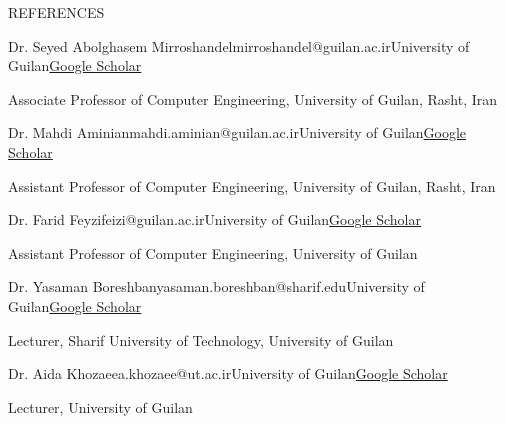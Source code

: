 \documentclass[]{CV}
\begin{document}
\pagebreak
\begin{section}{REFERENCES}
\begin{subsectionnobullet}{Dr. Seyed Abolghasem Mirroshandel}{mirroshandel@guilan.ac.ir}{University of Guilan}{\href{https://scholar.google.com/citations?user=WGH3eIsAAAAJ&hl=en}{Google Scholar}}
    \item {Associate Professor of Computer Engineering, University of Guilan, Rasht, Iran}
\end{subsectionnobullet}

\begin{subsectionnobullet}{Dr. Mahdi Aminian}{mahdi.aminian@guilan.ac.ir}{University of Guilan}{\href{https://scholar.google.com/citations?user=YVxXqIAAAAAJ&hl=en}{Google Scholar}}
\item {Assistant Professor of Computer Engineering, University of Guilan, Rasht, Iran}
\end{subsectionnobullet}

\begin{subsectionnobullet}{Dr. Farid Feyzi}{feizi@guilan.ac.ir}{University of Guilan}{\href{https://scholar.google.com/citations?user=HEBT11YAAAAJ&hl=en}{Google Scholar}}
\item {Assistant Professor of Computer Engineering, University of Guilan}
\end{subsectionnobullet}

\begin{subsectionnobullet}{Dr. Yasaman Boreshban}{yasaman.boreshban@sharif.edu}{University of Guilan}{\href{https://scholar.google.com/citations?hl=en&user=dKskDg8AAAAJ&hl=en}{Google Scholar}}
\item {Lecturer, Sharif University of Technology, University of Guilan}
\end{subsectionnobullet}

\begin{subsectionnobullet}{Dr. Aida Khozaee}{a.khozaee@ut.ac.ir}{University of Guilan}{\href{https://scholar.google.com/citations?user=eO3UXvEAAAAJ&hl=en}{Google Scholar}}
\item {Lecturer, University of Guilan}
\end{subsectionnobullet}

\end{section}
\end{document}
